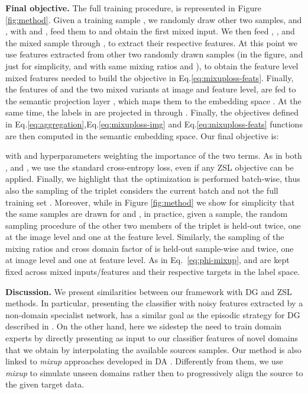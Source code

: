 \documentclass[runningheads]{llncs}
\newcommand{\myparagraph}[1]{\noindent\textbf{#1}}
\begin{document}
\myparagraph{Final objective.} {The full training procedure, is represented in Figure \ref{fig:method}. Given a training sample , we randomly draw other two samples,  and , with  and , feed them to  and obtain the first mixed input. We then feed , ,  and the mixed sample through , to extract their respective features. At this point we use features extracted from other two randomly drawn samples (in the figure, and just for simplicity,  and  with same mixing ratios  and ), to obtain the feature level mixed features needed to build the objective in Eq.\eqref{eq:mixuploss-feats}. Finally, the features of  and the two mixed variants at image and feature level, are fed to the semantic projection layer , which maps them to the embedding space . At the same time, the labels in  are projected in  through . Finally, the objectives defined in Eq.\eqref{eq:aggregation},Eq.\eqref{eq:mixuploss-img} and Eq.\eqref{eq:mixuploss-feats} functions are then computed in the semantic embedding space. } 
Our final objective is:
  
with  and  hyperparameters weighting the importance of the two terms. As  in both ,  and , we use the standard cross-entropy loss, even if any ZSL objective can be applied. Finally, we highlight that the optimization is performed batch-wise, thus also the sampling of the triplet considers the current batch and not the full training set . Moreover, while in Figure \ref{fig:method} we show for simplicity that the same samples are drawn for  and , in practice, given a sample, the random sampling procedure of the other two members of the triplet is held-out twice, one at the image level and one at the feature level. Similarly, the sampling of the mixing ratios  and cross domain factor  of  is held-out sample-wise and twice, one at image level and one at feature level. As in Eq.~\eqref{eq:phi-mixup},  and  are kept fixed across mixed inputs/features and their respective targets in the label space. 

\myparagraph{Discussion.} We present similarities between our framework with DG and ZSL methods. In particular, presenting the classifier with noisy features extracted by a non-domain specialist network, has a similar goal as the episodic strategy for DG described in \cite{li2019episodic}. On the other hand, here we sidestep the need to train domain experts by directly presenting as input to our classifier features of novel domains that we obtain by interpolating the available sources samples.  
Our method is also linked to \textit{mixup} approaches developed in DA {\cite{xu2019adversarial}}. Differently from them, we use \textit{mixup} to simulate unseen domains rather then to progressively align the source to the given target data.
\end{document}
